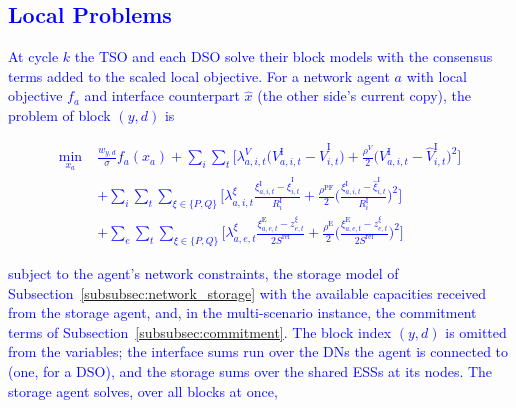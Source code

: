 \documentclass[preprint,12pt]{elsarticle}
\begin{document}
\subsection{\textcolor{blue}{Local Problems}}
\label{app:admm_updated_implementation}

\textcolor{blue}{At cycle $k$ the TSO and each DSO solve their block models with the consensus terms added to the
scaled local objective. For a network agent $a$ with local objective $f_a$ and interface counterpart $\hat{x}$ (the
other side's current copy), the problem of block $(y,d)$ is}

\textcolor{blue}{
    \begin{equation}
        \begin{aligned}
            \min_{x_a} \;
            & \frac{w_{y,d}}{\sigma} f_a(x_a)
            + \sum_{i} \sum_{t} \Big[
                \lambda^{V}_{a,i,t} \big(V^{\text{I}}_{a,i,t} - \hat{V}^{\text{I}}_{i,t}\big)
                + \frac{\rho^{V}}{2} \big(V^{\text{I}}_{a,i,t} - \hat{V}^{\text{I}}_{i,t}\big)^2
              \Big] \\
            & + \sum_{i} \sum_{t} \sum_{\xi \in \{P,Q\}} \Big[
                \lambda^{\xi}_{a,i,t} \frac{\xi^{\text{I}}_{a,i,t} - \hat{\xi}^{\text{I}}_{i,t}}{R^{\text{I}}_i}
                + \frac{\rho^{\text{PF}}}{2} \Big( \frac{\xi^{\text{I}}_{a,i,t} - \hat{\xi}^{\text{I}}_{i,t}}{R^{\text{I}}_i} \Big)^2
              \Big] \\
            & + \sum_{e} \sum_{t} \sum_{\xi \in \{P,Q\}} \Big[
                \lambda^{\xi}_{a,e,t} \frac{\xi^{\text{E}}_{a,e,t} - z^{\xi}_{e,t}}{2 S^{\text{ref}}}
                + \frac{\rho^{\text{E}}}{2} \Big( \frac{\xi^{\text{E}}_{a,e,t} - z^{\xi}_{e,t}}{2 S^{\text{ref}}} \Big)^2
              \Big]
        \end{aligned}
        \label{eq:admm_network_local}
    \end{equation}
}

\noindent
\textcolor{blue}{subject to the agent's network constraints, the storage model of
Subsection~\ref{subsubsec:network_storage} with the available capacities received from the storage agent, and, in the
multi-scenario instance, the commitment terms of Subsection~\ref{subsubsec:commitment}. The block index $(y,d)$ is
omitted from the variables; the interface sums run over the DNs the agent is connected to (one, for a DSO), and the
storage sums over the shared ESSs at its nodes. The storage agent solves, over all blocks at once,}
\end{document}

